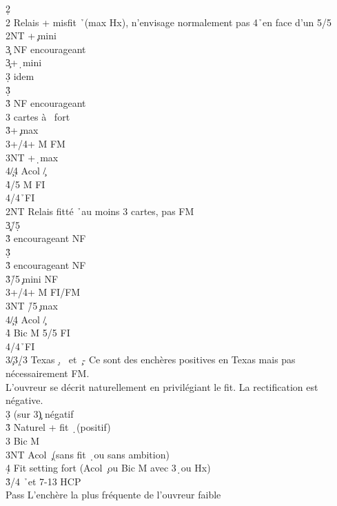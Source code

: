 \documentclass[a4paper]{article}
\begin{document}
\begin{bidtable}
2\d\+\\
2\s \> Relais + misfit \h\ (max Hx), n'envisage normalement pas 4\h\ en face d'un 5/5\+\\
2NT +\c\ mini\+\\
3\c \> NF encourageant\-\\
3\c {}+\d\ mini\+\\
3\d \> idem\-\\
3\d {}\h \+\\
3\h \> NF encourageant\\
3\s {} cartes à \s\ fort\-\\
3\h {}+\c\ max\\
3\s {}+/4+ M FM\\
3NT +\d\ max\\
4\c/4\d \> Acol \c /\d \\
4\h {}/5 M FI\\
4\s {}\s /4\h\ FI\-\\
2NT \> Relais fitté \h\ au moins 3 cartes, pas FM\+\\
3\c {}\h /5\d \+\\
3\h \> encourageant NF\-\\
3\d {}\h \+\\
3\h \> encourageant NF\-\\
3\h {}\h /5\c\ mini NF\\
3\s {}+/4+ M FI/FM\\
3NT \h /5\c\ max\\
4\c/4\d \> Acol \c /\d \\
4\h \> Bic M 5/5 FI\\
4\s {}\s /4\h\ FI\-\\
3\c/3\d/3\s \> Texas \d , \s\ et \c\ - Ce sont des enchères positives en Texas mais pas nécessairement FM.\\
\>L'ouvreur se décrit naturellement en privilégiant le fit. La rectification est négative.\+\\
3\d \> (sur 3\c ) négatif\\
3\h \> Naturel + fit \d\ (positif)\\
3\s \> Bic M\\
3NT \> Acol \c\ (sans fit \d\ ou sans ambition)\\
4\d \> Fit setting fort (Acol \c\ ou Bic M avec 3\d\ ou Hx)\-\\
3\h {}/4 \h\ et 7-13 HCP\+\\
Pass \> L'enchère la plus fréquente de l'ouvreur faible\\

\end{bidtable}
\end{document}
